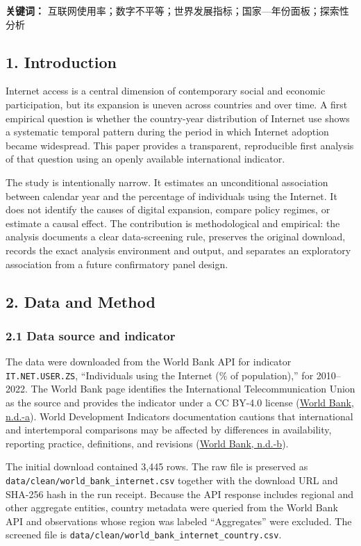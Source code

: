 \documentclass[12pt]{article}
\begin{document}
\textbf{关键词：} 互联网使用率；数字不平等；世界发展指标；国家—年份面板；探索性分析

\subsection{1. Introduction}
Internet access is a central dimension of contemporary social and economic participation, but its expansion is uneven across countries and over time. A first empirical question is whether the country-year distribution of Internet use shows a systematic temporal pattern during the period in which Internet adoption became widespread. This paper provides a transparent, reproducible first analysis of that question using an openly available international indicator.

The study is intentionally narrow. It estimates an unconditional association between calendar year and the percentage of individuals using the Internet. It does not identify the causes of digital expansion, compare policy regimes, or estimate a causal effect. The contribution is methodological and empirical: the analysis documents a clear data-screening rule, preserves the original download, records the exact analysis environment and output, and separates an exploratory association from a future confirmatory panel design.

\subsection{2. Data and Method}
\subsubsection{2.1 Data source and indicator}
The data were downloaded from the World Bank API for indicator \texttt{IT.NET.USER.ZS}, “Individuals using the Internet (\% of population),” for 2010–2022. The World Bank page identifies the International Telecommunication Union as the source and provides the indicator under a CC BY-4.0 license (\href{https://data.worldbank.org/indicator/IT.NET.USER.ZS}{World Bank, n.d.-a}). World Development Indicators documentation cautions that international and intertemporal comparisons may be affected by differences in availability, reporting practice, definitions, and revisions (\href{https://datatopics.worldbank.org/world-development-indicators/sources-and-methods.html}{World Bank, n.d.-b}).

The initial download contained 3,445 rows. The raw file is preserved as \texttt{data/clean/world\_bank\_internet.csv} together with the download URL and SHA-256 hash in the run receipt. Because the API response includes regional and other aggregate entities, country metadata were queried from the World Bank API and observations whose region was labeled “Aggregates” were excluded. The screened file is \texttt{data/clean/world\_bank\_internet\_country.csv}.
\end{document}
